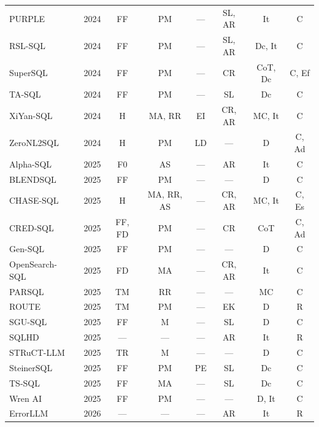 {\begin{longtable}{@{}llcccccc@{}}
PURPLE~\cite{PURPLE2024}                & 2024 & FF         & PM      & ---     & SL, AR    & It      & C       \\
RSL-SQL~\cite{RSL-SQL2024}              & 2024 & FF         & PM      & ---     & SL, AR    & Dc, It  & C       \\
SuperSQL~\cite{SuperSQL2024}            & 2024 & FF         & PM      & ---     & CR        & CoT, Dc & C, Ef   \\
TA-SQL~\cite{TA-SQL2024}                & 2024 & FF         & PM      & ---     & SL        & Dc      & C       \\
XiYan-SQL~\cite{XiYan-SQL2024}          & 2024 & H          & MA, RR  & EI      & CR, AR    & MC, It  & C       \\
ZeroNL2SQL~\cite{ZeroNL2SQL2024}        & 2024 & H          & PM      & LD      & ---       & D       & C, Ad   \\
Alpha-SQL~\cite{Alpha-SQL2025}          & 2025 & F0         & AS      & ---     & AR        & It      & C       \\
BLENDSQL~\cite{BLENDSQL2025}            & 2025 & FF         & PM      & ---     & ---       & D       & C       \\
CHASE-SQL~\cite{CHASE-SQL2025}          & 2025 & H          & MA, RR, AS & ---  & CR, AR    & MC, It  & C, Es   \\
CRED-SQL~\cite{CRED-SQL2025}            & 2025 & FF, FD     & PM      & ---     & CR        & CoT     & C, Ad   \\
Gen-SQL~\cite{Gen-SQL2025}              & 2025 & FF         & PM      & ---     & ---       & D       & C       \\
OpenSearch-SQL~\cite{OpenSearch-SQL2025} & 2025 & FD        & MA      & ---     & CR, AR    & It      & C       \\
PARSQL~\cite{PARSQL2025}                & 2025 & TM         & RR      & ---     & ---       & MC      & C       \\
ROUTE~\cite{ROUTE2025}                  & 2025 & TM         & PM      & ---     & EK        & D       & R       \\
SGU-SQL~\cite{SGU-SQL2025}              & 2025 & FF         & M       & ---     & SL        & D       & C       \\
SQLHD~\cite{SQLHD2025}                  & 2025 & ---        & ---     & ---     & AR        & It      & R       \\
STRuCT-LLM~\cite{STRuCT-LLM2025}        & 2025 & TR         & M       & ---     & ---       & D       & C       \\
SteinerSQL~\cite{SteinerSQL2025}        & 2025 & FF         & PM      & PE      & SL        & Dc      & C       \\
TS-SQL~\cite{TS-SQL2025}                & 2025 & FF         & MA      & ---     & SL        & Dc      & C       \\
Wren AI~\cite{WrenAI2025}               & 2025 & FF         & PM      & ---     & ---       & D, It   & C       \\
ErrorLLM~\cite{errorllm2026}            & 2026 & ---        & ---     & ---     & AR        & It      & R       \\

\end{longtable}
}
